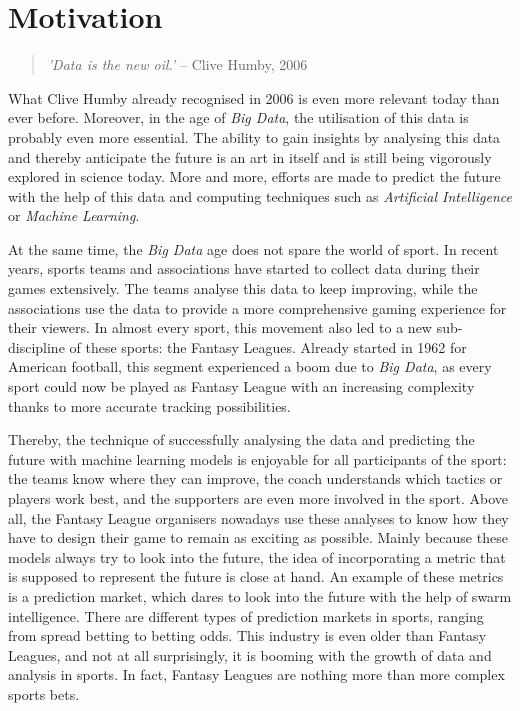 \section{Motivation}

\begin{quote}
    \begin{center}
        \emph{'Data is the new oil.'}   -- Clive Humby, 2006
    \end{center}
\end{quote}

What Clive Humby already recognised in 2006 is even more relevant today than ever before. Moreover, in the age of \emph{Big Data}, the utilisation of this data is probably even more essential. The ability to gain insights by analysing this data and thereby anticipate the future is an art in itself and is still being vigorously explored in science today. More and more, efforts are made to predict the future with the help of this data and computing techniques such as \emph{Artificial Intelligence} or \emph{Machine Learning}.

At the same time, the \emph{Big Data} age does not spare the world of sport. \parencite[cf.][]{rein_big_2016} In recent years, sports teams and associations have started to collect data during their games extensively. The teams analyse this data to keep improving, while the associations use the data to provide a more comprehensive gaming experience for their viewers. In almost every sport, this movement also led to a new sub-discipline of these sports: the Fantasy Leagues. Already started in 1962 for American football, this segment experienced a boom due to \emph{Big Data}, as every sport could now be played as Fantasy League with an increasing complexity thanks to more accurate tracking possibilities.

\clearpage Thereby, the technique of successfully analysing the data and predicting the future with machine learning models is enjoyable for all participants of the sport: the teams know where they can improve, the coach understands which tactics or players work best, and the supporters are even more involved in the sport. Above all, the Fantasy League organisers nowadays use these analyses to know how they have to design their game to remain as exciting as possible. Mainly because these models always try to look into the future, the idea of incorporating a metric that is supposed to represent the future is close at hand. An example of these metrics is a prediction market, which dares to look into the future with the help of swarm intelligence. There are different types of prediction markets in sports, ranging from spread betting to betting odds. This industry is even older than Fantasy Leagues, and not at all surprisingly, it is booming with the growth of data and analysis in sports. In fact, Fantasy Leagues are nothing more than more complex sports bets. 


